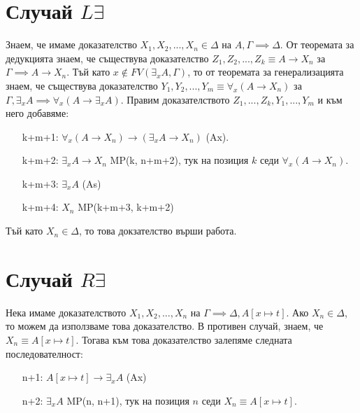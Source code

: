 \documentclass[12pt]{article}
\begin{document}
\section*{Случай $L \exists$}
Знаем, че имаме доказателство $X_1, X_2, ..., X_n \in \Delta$ на $A, \Gamma \implies \Delta$. От теоремата за дедукцията знаем, че съществува доказателство $Z_1, Z_2, ..., Z_k \equiv A \rightarrow X_n$ за $\Gamma \implies A \rightarrow X_n$. Тъй като $x \not\in FV(\exists_x A, \Gamma)$, то от теоремата за генерализацията знаем, че съществува доказателство $Y_1, Y_2, ..., Y_m \equiv \forall_x (A \rightarrow X_n)$ за $\Gamma, \exists_x A \implies \forall_x (A \rightarrow \exists_x A)$. Правим доказателството $Z_1, ..., Z_k, Y_1, ..., Y_m$ и към него добавяме:
\begin{itemize}[itemindent=4em]
    \item[k+m+1: ] $\forall_x(A \rightarrow X_n) \rightarrow (\exists_x A \rightarrow X_n)$ (Ax).
    \item[k+m+2: ] $\exists_x A \rightarrow X_n$  MP(k, n+m+2), тук на позиция $k$ седи $\forall_x(A \rightarrow X_n)$.
    \item[k+m+3: ] $\exists_x A$ (As)
    \item[k+m+4: ] $X_n$ MP(k+m+3, k+m+2)    
\end{itemize}
Тъй като $X_n \in \Delta$, то това докзателство върши работа.

\section*{Случай $R \exists$}
Нека имаме доказателството $X_1, X_2, ..., X_n$ на $\Gamma \implies \Delta, A[x \longmapsto t]$. Ако $X_n \in \Delta$, то можем да използваме това доказателство. В противен случай, знаем, че $X_n \equiv A[x \longmapsto t]$. Тогава към това доказателство залепяме следната последователност:
\begin{itemize}[itemindent=4em]
    \item[n+1: ] $A[x \longmapsto t] \rightarrow \exists_x A$ (Ax)
    \item[n+2: ] $\exists_x A$ MP(n, n+1), тук на позиция $n$ седи $X_n \equiv A[x \longmapsto t]$. 
\end{itemize}
\end{document}
